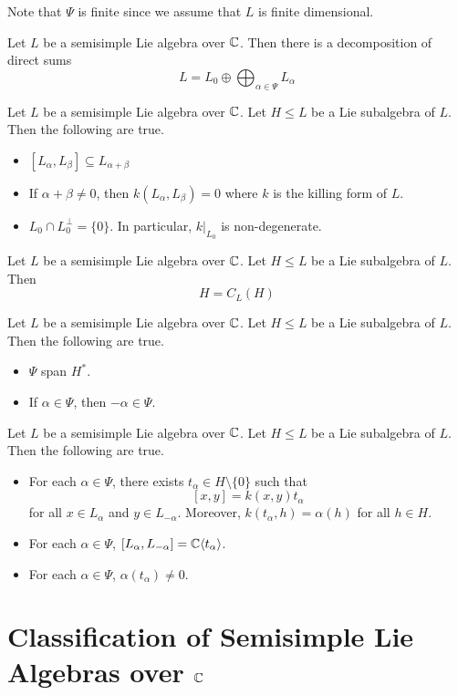 \documentclass[a4paper]{article}
\begin{document}
Note that $\Psi$ is finite since we assume that $L$ is finite dimensional. 

\begin{lmm}{}{} Let $L$ be a semisimple Lie algebra over $\mathbb{C}$. Then there is a decomposition of direct sums $$L=L_0\oplus\bigoplus_{\alpha\in\Psi}L_\alpha$$
\end{lmm}

\begin{prp}{}{} Let $L$ be a semisimple Lie algebra over $\mathbb{C}$. Let $H\leq L$ be a Lie subalgebra of $L$. Then the following are true. 
\begin{itemize}
\item $[L_\alpha,L_\beta]\subseteq L_{\alpha+\beta}$
\item If $\alpha+\beta\neq 0$, then $k(L_\alpha,L_\beta)=0$ where $k$ is the killing form of $L$. 
\item $L_0\cap L_0^\perp=\{0\}$. In particular, $k|_{L_0}$ is non-degenerate. 
\end{itemize}
\end{prp}

\begin{prp}{}{} Let $L$ be a semisimple Lie algebra over $\mathbb{C}$. Let $H\leq L$ be a Lie subalgebra of $L$. Then $$H=C_L(H)$$
\end{prp}

\begin{lmm}{}{} Let $L$ be a semisimple Lie algebra over $\mathbb{C}$. Let $H\leq L$ be a Lie subalgebra of $L$. Then the following are true. 
\begin{itemize}
\item $\Psi$ span $H^\ast$. 
\item If $\alpha\in\Psi$, then $-\alpha\in\Psi$. 
\end{itemize}
\end{lmm}

\begin{lmm}{}{} Let $L$ be a semisimple Lie algebra over $\mathbb{C}$. Let $H\leq L$ be a Lie subalgebra of $L$. Then the following are true. 
\begin{itemize}
\item For each $\alpha\in\Psi$, there exists $t_\alpha\in H\setminus\{0\}$ such that $$[x,y]=k(x,y)t_\alpha$$ for all $x\in L_\alpha$ and $y\in L_{-\alpha}$. Moreover, $k(t_\alpha,h)=\alpha(h)$ for all $h\in H$. 
\item For each $\alpha\in\Psi$, $[L_\alpha,L_{-\alpha}]=\mathbb{C}\langle t_\alpha\rangle$. 
\item For each $\alpha\in\Psi$, $\alpha(t_\alpha)\neq 0$. 
\end{itemize}
\end{lmm}


\pagebreak
\section{Classification of Semisimple Lie Algebras over $\mathbb{C}$}
\end{document}
